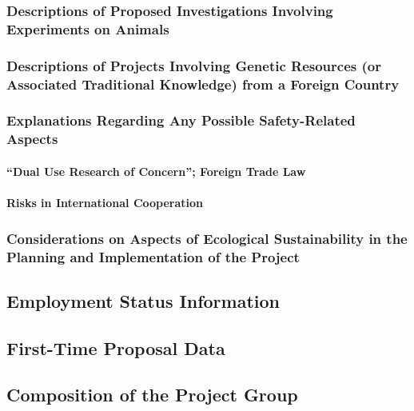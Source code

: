 \documentclass[de]{dfg-proposal}
\begin{document}

\subsubsection{Descriptions of Proposed Investigations Involving Experiments on Animals}

\subsubsection{Descriptions of Projects Involving Genetic Resources (or Associated Traditional Knowledge) from a Foreign Country}

\subsubsection{Explanations Regarding Any Possible Safety-Related Aspects}

\paragraph{“Dual Use Research of Concern”; Foreign Trade Law}

\paragraph{Risks in International Cooperation}

\subsubsection{Considerations on Aspects of Ecological Sustainability in the Planning and Implementation of the Project}

\subsection{Employment Status Information}

\subsection{First-Time Proposal Data}

\subsection{Composition of the Project Group}
\end{document}

